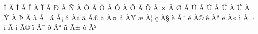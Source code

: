 \mubyte ^^cc ^^c3^^8c\endmubyte %
\mubyte ^^cd ^^c3^^8d\endmubyte %
\mubyte ^^ce ^^c3^^8e\endmubyte %
\mubyte ^^cf ^^c3^^8f\endmubyte %
\mubyte ^^d0 ^^c3^^90\endmubyte %
\mubyte ^^d1 ^^c3^^91\endmubyte %
\mubyte ^^d2 ^^c3^^92\endmubyte %
\mubyte ^^d3 ^^c3^^93\endmubyte %
\mubyte ^^d4 ^^c3^^94\endmubyte %
\mubyte ^^d5 ^^c3^^95\endmubyte %
\mubyte ^^d6 ^^c3^^96\endmubyte %
\mubyte ^^d7 ^^c5^^92\endmubyte %
\mubyte ^^d8 ^^c3^^98\endmubyte %
\mubyte ^^d9 ^^c3^^99\endmubyte %
\mubyte ^^da ^^c3^^9a\endmubyte %
\mubyte ^^db ^^c3^^9b\endmubyte %
\mubyte ^^dc ^^c3^^9c\endmubyte %
\mubyte ^^dd ^^c3^^9d\endmubyte %
\mubyte ^^de ^^c3^^9e\endmubyte %
\mubyte ^^e0 ^^c3^^a0\endmubyte %
\mubyte ^^e1 ^^c3^^a1\endmubyte %
\mubyte ^^e2 ^^c3^^a2\endmubyte %
\mubyte ^^e3 ^^c3^^a3\endmubyte %
\mubyte ^^e4 ^^c3^^a4\endmubyte %
\mubyte ^^e5 ^^c3^^a5\endmubyte %
\mubyte ^^e6 ^^c3^^a6\endmubyte %
\mubyte ^^e7 ^^c3^^a7\endmubyte %
\mubyte ^^e8 ^^c3^^a8\endmubyte %
\mubyte ^^e9 ^^c3^^a9\endmubyte %
\mubyte ^^ea ^^c3^^aa\endmubyte %
\mubyte ^^eb ^^c3^^ab\endmubyte %
\mubyte ^^ec ^^c3^^ac\endmubyte %
\mubyte ^^ed ^^c3^^ad\endmubyte %
\mubyte ^^ee ^^c3^^ae\endmubyte %
\mubyte ^^ef ^^c3^^af\endmubyte %
\mubyte ^^f0 ^^c3^^b0\endmubyte %
\mubyte ^^f1 ^^c3^^b1\endmubyte %
\mubyte ^^f2 ^^c3^^b2\endmubyte %
